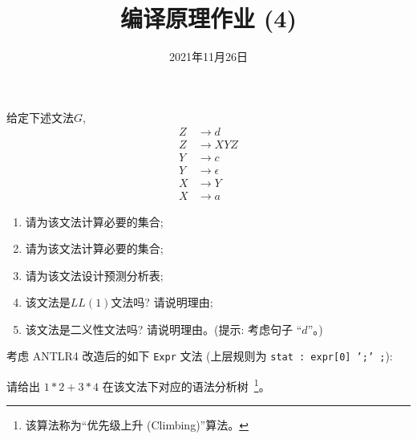 \documentclass[a4paper, justified]{tufte-handout}
\title{编译原理作业 (4)}
\date{2021年11月26日}
\begin{document}
\maketitle
\noplagiarism %
\begin{abstract}
\end{abstract}
\beginrequired

\begin{problem}[\score{10 = 3 + 3 + 2 + 1 + 1}]
  给定下述文法$G$,
  \begin{align}
    Z &\to d \\[8pt]
    Z &\to XYZ \\[8pt]
    Y &\to c \\[8pt]
    Y &\to \epsilon \\[8pt]
    X &\to Y \\[8pt]
    X &\to a
  \end{align}

  \begin{enumerate}[(1)]
    \item 请为该文法计算必要的\first{}集合;
    \item 请为该文法计算必要的\follow{}集合;
    \item 请为该文法设计预测分析表;
    \item 该文法是$LL(1)$文法吗? 请说明理由;
    \item 该文法是二义性文法吗? 请说明理由。({提示: 考虑句子 ``$d$''}。)
  \end{enumerate}
\end{problem}

\begin{solution}
\end{solution}

\pagebreak
\begin{problem}[\score{10}]
  考虑 ANTLR4 改造后的如下 \texttt{Expr} 文法
  (上层规则为 \texttt{stat : expr[0] ';' ;}):


  \noindent 请给出 $1 \ast 2 + 3 \ast 4$ 在该文法下对应的语法分析树~\footnote{该算法称为``优先级上升 (Climbing)''算法。}。
\end{problem}
\end{document}
